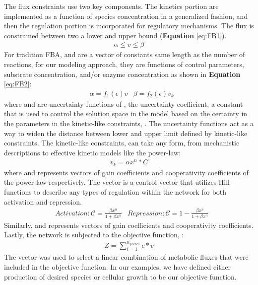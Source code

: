 \documentclass[12pt]{article}
\begin{document}
The flux constraints use two key components. The kinetics portion are implemented as a function of species concentration in a generalized fashion, and then the regulation portion is incorporated for regulatory mechanisms. The flux is constrained between two a lower and upper bound (\textbf{Equation} \eqref{eq:FB1}).
\begin{equation}\label{eq:FB1}
\begin{aligned}
\alpha \le v \le\beta   
\end{aligned}
\end{equation}
For tradition FBA,  and  are a vector of constants same length as the number of reactions, for our modeling approach, they are functions of control parameters, substrate concentration, and/or enzyme concentration as shown in \textbf{Equation} \eqref{eq:FB2}:
\begin{equation}\label{eq:FB2}
\begin{aligned}
&\alpha=f_1 (\epsilon)v
&\beta=f_2  (\epsilon)v_k
\end{aligned}
\end{equation}
where and  are uncertainty functions of  , the uncertainty coefficient, a constant that is used to control the solution space in the model based on the certainty in the parameters in the kinetic-like constraints, . The uncertainty functions act as a way to widen the distance between lower and upper limit defined by kinetic-like constraints. The kinetic-like constraints,  can take any form, from mechanistic descriptions to effective kinetic models like the power-law:
\begin{equation}\label{eq:FB3}
\begin{aligned}
v_k= \alpha x^n*C          
\end{aligned}
\end{equation}
where  and  represents vectors of gain coefficients and cooperativity coefficients of the power law respectively. The  vector is a control vector that utilizes Hill-functions to describe any types of regulation within the network for both activation and repression.
\begin{equation}\label{eq:HillFunction}
\begin{aligned}
&Activation: \mathcal{C} = \frac{\beta x^n}{1+\beta x^n}
&Repression: \mathcal{C} = 1 - \frac{\beta x^n}{1+\beta x^n}
\end{aligned}
\end{equation}
Similarly,  and  represents vectors of gain coefficients and cooperativity coefficients.
Lastly, the network is subjected to the objective function, :
\begin{equation}\label{eq:OBJ}
\begin{aligned}
Z = \sum_{i=1}^{n_{fluxes}} c*v
\end{aligned}
\end{equation}
The vector  was used to select a linear combination of metabolic fluxes that were included in the objective function. In our examples, we have defined either production of desired species or cellular growth to be our objective function. 
\end{document}
